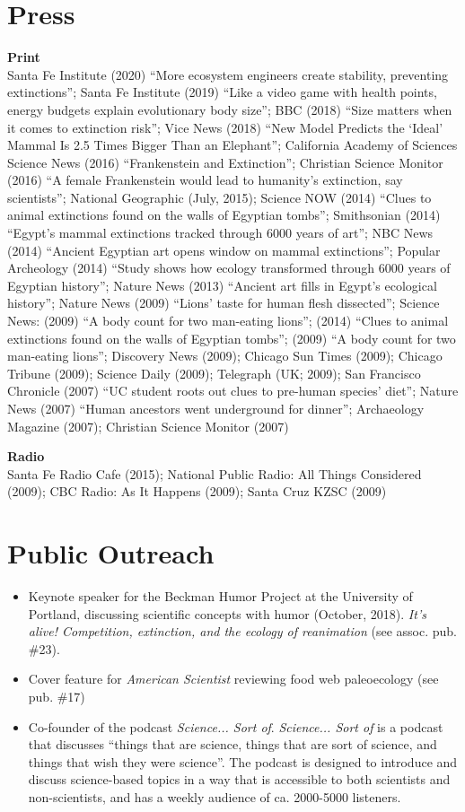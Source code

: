 \documentclass[margin,line,12pt]{res}
\begin{document}
\begin{resume}
\section{\sc Press}
{\bf Print}\\
Santa Fe Institute (2020) ``More ecosystem engineers create stability, preventing extinctions''; 
Santa Fe Institute (2019) ``Like a video game with health points, energy budgets explain evolutionary body size'';
BBC (2018) ``Size matters when it comes to extinction risk'';
Vice News (2018) ``New Model Predicts the `Ideal' Mammal Is 2.5 Times Bigger Than an Elephant'';
California Academy of Sciences Science News (2016) ``Frankenstein and Extinction'';
Christian Science Monitor (2016) ``A female Frankenstein would lead to humanity's extinction, say scientists'';
National Geographic (July, 2015);
Science NOW (2014) ``Clues to animal extinctions found on the walls of Egyptian tombs'';
Smithsonian (2014) ``Egypt’s mammal extinctions tracked through 6000 years of art'';
NBC News (2014) ``Ancient Egyptian art opens window on mammal extinctions'';
Popular Archeology (2014) ``Study shows how ecology transformed through 6000 years of Egyptian history'';
Nature News (2013) ``Ancient art fills in Egypt’s ecological history'';
Nature News (2009) ``Lions’ taste for human flesh dissected'';
Science News: (2009) ``A body count for two man-eating lions'';
(2014) ``Clues to animal extinctions found on the walls of Egyptian tombs'';
(2009) ``A body count for two man-eating lions'';
Discovery News (2009);
Chicago Sun Times (2009);
Chicago Tribune (2009);
Science Daily (2009);
Telegraph (UK; 2009);
San Francisco Chronicle (2007) ``UC student roots out clues to pre-human species’ diet'';
Nature News (2007) ``Human ancestors went underground for dinner'';
Archaeology Magazine (2007);
Christian Science Monitor (2007)

{\bf Radio}\\
Santa Fe Radio Cafe (2015);
National Public Radio: All Things Considered (2009);
CBC Radio: As It Happens (2009);
Santa Cruz KZSC (2009)

\section{\sc Public Outreach}
\begin{itemize}
  \item Keynote speaker for the Beckman Humor Project at the University of Portland, discussing scientific concepts with humor (October, 2018). \emph{It's alive! Competition, extinction, and the ecology of reanimation} (see assoc. pub. \#23).
  \item Cover feature for \emph{American Scientist} reviewing food web paleoecology (see pub. \#17)
  \item Co-founder of the podcast \emph{Science... Sort of}. \emph{Science... Sort of} is a podcast that discusses ``things that are science, things that are sort of science, and things that wish they were science''. The podcast is designed to introduce and discuss science-based topics in a way that is accessible to both scientists and non-scientists, and has a weekly audience of ca. 2000-5000 listeners.
\end{itemize}


\end{resume}
\end{document}
